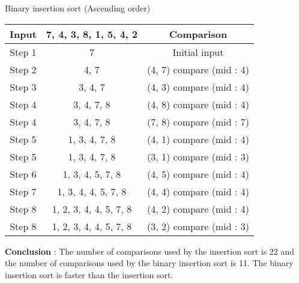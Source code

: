 \bigskip
\noindent Binary insertion sort (Ascending order)
\smallskip

\begin{tabular}{|c|c|c|}
    \hline
    Input & 7, 4, 3, 8, 1, 5, 4, 2& Comparison \\
    \hline
    Step 1& 7 & Initial input \\
    \hline
    Step 2& 4, 7 & (4, 7) compare (mid : 4)\\
    \hline
    Step 3& 3, 4, 7& (4, 3) compare (mid : 4)\\
    \hline
    Step 4& 3, 4, 7, 8& (4, 8) compare (mid : 4)\\
    Step 4& 3, 4, 7, 8& (7, 8) compare (mid : 7)\\
    \hline
    Step 5& 1, 3, 4, 7, 8& (4, 1) compare (mid : 4)\\
    Step 5& 1, 3, 4, 7, 8& (3, 1) compare (mid : 3)\\
    \hline
    Step 6& 1, 3, 4, 5, 7, 8& (4, 5) compare (mid : 4)\\
    \hline
    Step 7& 1, 3, 4, 4, 5, 7, 8& (4, 4) compare (mid : 4)\\
    \hline
    Step 8& 1, 2, 3, 4, 4, 5, 7, 8& (4, 2) compare (mid : 4)\\
    Step 8& 1, 2, 3, 4, 4, 5, 7, 8& (3, 2) compare (mid : 3)\\
    \hline
\end{tabular}

\bigskip
\textbf{Conclusion} : The number of comparisons used by the insertion sort is 22 and the number of comparisons used by the binary insertion sort is 11. The binary insertion sort is faster than the insertion sort.
